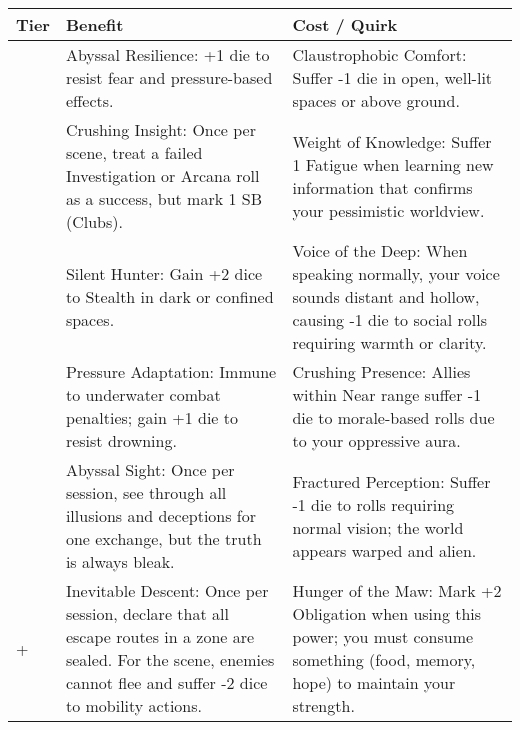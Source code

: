 \begin{longtable}{>{\raggedright\arraybackslash}p{1cm} p{5cm} p{5cm}}
\toprule
\textbf{Tier} & \textbf{Benefit} & \textbf{Cost / Quirk} \\
\midrule
1 & Abyssal Resilience: +1 die to resist fear and pressure-based effects. & Claustrophobic Comfort: Suffer -1 die in open, well-lit spaces or above ground. \\
\midrule
2 & Crushing Insight: Once per scene, treat a failed Investigation or Arcana roll as a success, but mark 1 SB (Clubs). & Weight of Knowledge: Suffer 1 Fatigue when learning new information that confirms your pessimistic worldview. \\
\midrule
3 & Silent Hunter: Gain +2 dice to Stealth in dark or confined spaces. & Voice of the Deep: When speaking normally, your voice sounds distant and hollow, causing -1 die to social rolls requiring warmth or clarity. \\
\midrule
4 & Pressure Adaptation: Immune to underwater combat penalties; gain +1 die to resist drowning. & Crushing Presence: Allies within Near range suffer -1 die to morale-based rolls due to your oppressive aura. \\
\midrule
5 & Abyssal Sight: Once per session, see through all illusions and deceptions for one exchange, but the truth is always bleak. & Fractured Perception: Suffer -1 die to rolls requiring normal vision; the world appears warped and alien. \\
\midrule
6+ & Inevitable Descent: Once per session, declare that all escape routes in a zone are sealed. For the scene, enemies cannot flee and suffer -2 dice to mobility actions. & Hunger of the Maw: Mark +2 Obligation when using this power; you must consume something (food, memory, hope) to maintain your strength. \\
\bottomrule
\end{longtable}